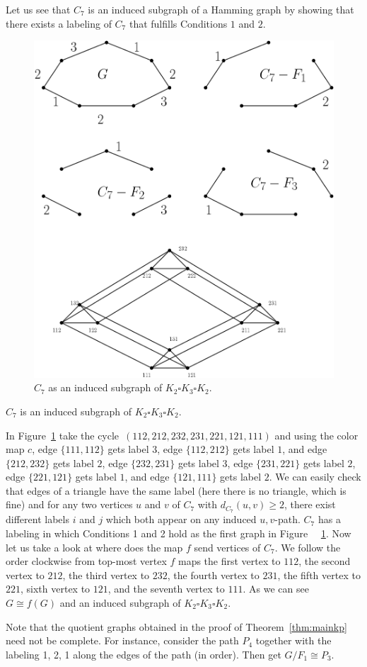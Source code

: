 \documentclass[12pt,a4paper,titlepage,openany]{report}
\begin{document}
\begin{example} Let us see that $C_7$ is an induced subgraph of a Hamming graph by showing that there exists a labeling of $C_7$ that fulfills Conditions $1$ and $2$.
\begin{figure}[h!]
\begin{center}
\includegraphics[width=0.8\linewidth]{figures/c_7inducedhamming.png}
\end{center}
\caption{$C_7$ as an induced subgraph of $K_2\square K_3\square K_2$.}\label{fig:c7induced}
\end{figure}
\newline
$C_7$ is an induced subgraph of $K_2\square K_3\square K_2$. 

In Figure~\ref{fig:c7induced} take the cycle~$(112,212,232,231,221,121,111)$ and using the color map $c$, edge $\{111,112\}$ gets label $3$, edge $\{112,212\}$ gets label $1$, and edge $\{212,232\}$ gets label $2$, edge $\{232,231\}$ gets label $3$, edge $\{231,221\}$ gets label $2$, edge $\{221,121\}$ gets label $1$, and edge $\{121,111\}$ gets label $2$. We can easily check that edges of a triangle have the same label (here there is no triangle, which is fine) and for any two vertices $u$ and $v$ of $C_7$ with $d_{C_7}(u,v) \geq 2$, there exist different labels $i$ and $j$ which both appear on any induced $u, v$-path.\newline
$C_7$ has a labeling in which Conditions 1 and 2 hold as the first graph in Figure ~~\ref{fig:c7induced}. Now let us take a look at where does the map $f$ send vertices of $C_7$. We follow the order clockwise from top-most vertex $f$ maps the first vertex to $112$, the second vertex to $212$, the third vertex to $232$, the fourth vertex to $231$, the fifth vertex to $221$, sixth vertex to $121$, and the seventh vertex to $111$. As we can see $G\cong f(G)$ and an induced subgraph of $K_2\square K_3\square K_2$.
\end{example}
Note that the quotient graphs obtained in the proof of Theorem~\ref{thm:mainkp} need not be complete. For instance, consider the path $P_4$ together with the labeling 1, 2, 1 along the edges of the path (in order). Then get $G/ F_1\cong P_3$.
\end{document}
